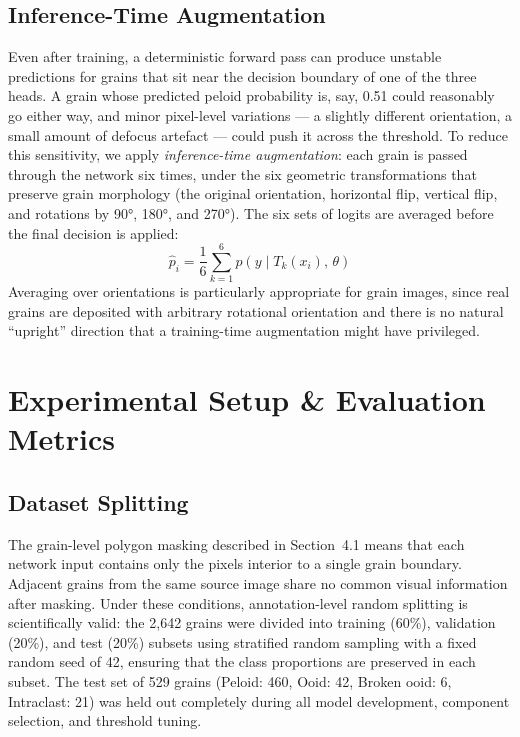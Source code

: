 \documentclass[a4paper,fleqn]{cas-dc}
\begin{document}
\subsection{Inference-Time Augmentation}
\label{sec:tta}
Even after training, a deterministic forward pass can produce unstable predictions for grains that sit near the decision boundary of one of the three heads. A grain whose predicted peloid probability is, say, 0.51 could reasonably go either way, and minor pixel-level variations --- a slightly different orientation, a small amount of defocus artefact --- could push it across the threshold. To reduce this sensitivity, we apply \textit{inference-time augmentation}: each grain is passed through the network six times, under the six geometric transformations that preserve grain morphology (the original orientation, horizontal flip, vertical flip, and rotations by 90°, 180°, and 270°). The six sets of logits are averaged before the final decision is applied:
\begin{equation}
\hat{p}_i = \frac{1}{6}\sum_{k=1}^{6} p\!\left(y \mid T_k(x_i),\, \theta\right)
\end{equation}
Averaging over orientations is particularly appropriate for grain images, since real grains are deposited with arbitrary rotational orientation and there is no natural ``upright'' direction that a training-time augmentation might have privileged.

\section{Experimental Setup \& Evaluation Metrics}

\subsection{Dataset Splitting}
The grain-level polygon masking described in Section~4.1 means that each network input contains only the pixels interior to a single grain boundary. Adjacent grains from the same source image share no common visual information after masking. Under these conditions, annotation-level random splitting is scientifically valid: the 2,642 grains were divided into training (60\%), validation (20\%), and test (20\%) subsets using stratified random sampling with a fixed random seed of 42, ensuring that the class proportions are preserved in each subset. The test set of 529 grains (Peloid: 460, Ooid: 42, Broken ooid: 6, Intraclast: 21) was held out completely during all model development, component selection, and threshold tuning.
\end{document}
